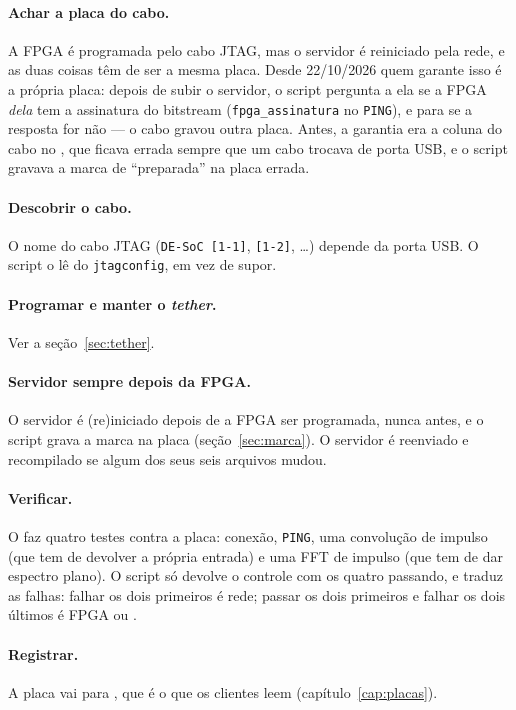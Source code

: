 \paragraph{Achar a placa do cabo.} A FPGA é programada pelo cabo JTAG, mas o
servidor é reiniciado pela rede, e as duas coisas têm de ser a mesma placa.
Desde 22/10/2026 quem garante isso é a própria placa: depois de subir o
servidor, o script pergunta a ela se a FPGA \emph{dela} tem a assinatura do
bitstream (\texttt{fpga\_assinatura} no \texttt{PING}), e para se a resposta
for não --- o cabo gravou outra placa. Antes, a garantia era a coluna do cabo
no , que ficava errada sempre que um cabo trocava de porta
USB, e o script gravava a marca de ``preparada'' na placa errada.

\paragraph{Descobrir o cabo.} O nome do cabo JTAG (\texttt{DE-SoC [1-1]},
\texttt{[1-2]}, \ldots) depende da porta USB. O script o lê do
\texttt{jtagconfig}, em vez de supor.

\paragraph{Programar e manter o \emph{tether}.} Ver a seção~\ref{sec:tether}.

\paragraph{Servidor sempre depois da FPGA.} O servidor é (re)iniciado depois de
a FPGA ser programada, nunca antes, e o script grava a marca
 na placa (seção~\ref{sec:marca}). O
servidor é reenviado e recompilado se algum dos seus seis arquivos mudou.

\paragraph{Verificar.} O  faz quatro testes contra a
placa: conexão, \texttt{PING}, uma convolução de impulso (que tem de devolver a
própria entrada) e uma FFT de impulso (que tem de dar espectro plano). O script
só devolve o controle com os quatro passando, e traduz as falhas: falhar os dois
primeiros é rede; passar os dois primeiros e falhar os dois últimos é FPGA ou
.

\paragraph{Registrar.} A placa vai para , que é o
que os clientes leem (capítulo~\ref{cap:placas}).

